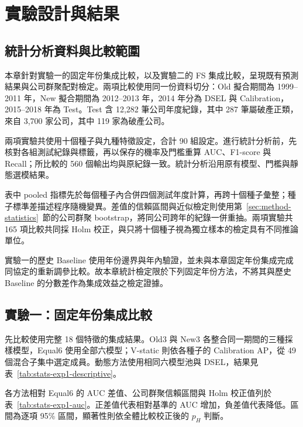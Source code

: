 \chapter{實驗設計與結果}\label{chap:results}
\begingroup
\setlength{\emergencystretch}{2em}

\section{統計分析資料與比較範圍}

本章針對實驗一的固定年份集成比較，以及實驗二的 FS 集成比較，呈現既有預測結果與公司群聚配對檢定。兩項比較使用同一份資料切分：Old 擬合期間為 1999--2011 年，New 擬合期間為 2012--2013 年，2014 年分為 DSEL 與 Calibration，2015--2018 年為 Test。Test 含 12,282 筆公司年度紀錄，其中 287 筆屬破產正類，來自 3,700 家公司，其中 119 家為破產公司。

兩項實驗共使用十個種子與九種特徵設定，合計 90 組設定。進行統計分析前，先核對各組測試紀錄與標籤，再以保存的機率及門檻重算 AUC、F1-score 與 Recall；所比較的 560 個輸出均與原紀錄一致。統計分析沿用原有模型、門檻與靜態選模結果。

表中 pooled 指標先於每個種子內合併四個測試年度計算，再跨十個種子彙整；種子標準差描述程序隨機變異。差值的信賴區間與近似檢定則使用第~\ref{sec:method-statistics}~節的公司群聚 bootstrap，將同公司跨年的紀錄一併重抽。兩項實驗共 165 項比較共同採 Holm 校正，與只將十個種子視為獨立樣本的檢定具有不同推論單位。

實驗一的歷史 Baseline 使用年份邊界與年內驗證，並未與本章固定年份集成完成同協定的重新調參比較。故本章統計檢定限於下列固定年份方法，不將其與歷史 Baseline 的分數差作為集成效益之檢定證據。

\section{實驗一：固定年份集成比較}\label{sec:results-experiment1}

先比較使用完整 18 個特徵的集成結果。Old3 與 New3 各整合同一期間的三種採樣模型，Equal6 使用全部六模型；V-static 則依各種子的 Calibration AP，從 49 個混合子集中選定成員。動態方法使用相同六模型池與 DSEL，結果見表~\ref{tab:stats-exp1-descriptive}。



各方法相對 Equal6 的 AUC 差值、公司群聚信賴區間與 Holm 校正值列於表~\ref{tab:stats-exp1-auc}。正差值代表相對基準的 AUC 增加，負差值代表降低。區間為逐項 95\% 區間，顯著性則依全體比較校正後的 \(p_H\) 判斷。

